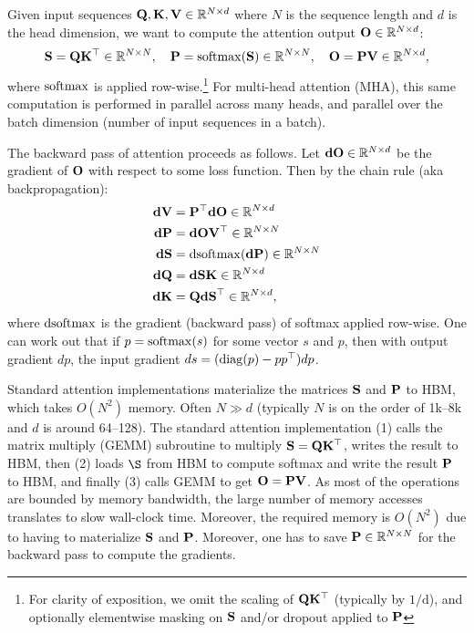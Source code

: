 Given input sequences $\mathbf{Q}, \mathbf{K}, \mathbf{V} \in \mathbb{R}^{N \times d}$ where $N$ is the sequence length and
$d$ is the head dimension, we want to compute the attention output $\mathbf{O} \in \mathbb{R}^{N \times d}$:
\begin{equation*}
  \mathbf{S} = \mathbf{Q} \mathbf{K}^\top \in \mathbb{R}^{N \times N}, \quad \mathbf{P} = \mathrm{softmax}(\mathbf{S}) \in \mathbb{R}^{N \times N}, \quad \mathbf{O} = \mathbf{P}\mathbf{V} \in \mathbb{R}^{N \times d},
\end{equation*}
where $\mathrm{softmax}$ is applied row-wise.\footnote{For clarity of exposition, we
  omit the scaling of $\mathbf{Q} \mathbf{K}^\top$ (typically by $1/\mathrm{d}$), and optionally
  elementwise masking on $\mathbf{S}$ and/or dropout applied to $\mathbf{P}$} For multi-head
attention (MHA), this same computation is performed in parallel across many
heads, and parallel over the batch dimension (number of input sequences in a
batch).

The backward pass of attention proceeds as follows.
Let $\mathbf{dO} \in \mathbb{R}^{N \times d}$ be the gradient of $\mathbf{O}$ with respect to some loss
function. Then by the chain rule (aka backpropagation):
\begin{align*}
  \mathbf{dV} &= \mathbf{P}^\top \mathbf{dO} \in \mathbb{R}^{N \times d} \\
  \mathbf{dP} &= \mathbf{dO} \mathbf{V}^\top \in \mathbb{R}^{N \times N} \\
  \mathbf{dS} &= \mathrm{dsoftmax} (\mathbf{dP}) \in \mathbb{R}^{N \times N} \\
  \mathbf{dQ} &= \mathbf{dS} \mathbf{K} \in \mathbb{R}^{N \times d} \\
  \mathbf{dK} &= \mathbf{Q} \mathbf{dS}^\top \in \mathbb{R}^{N \times d},
\end{align*}
where $\mathrm{dsoftmax}$ is the gradient (backward pass) of softmax applied row-wise.
One can work out that if $p = \mathrm{softmax}(s)$ for some vector $s$ and $p$, then
with output gradient $dp$, the input gradient $ds = (\mathrm{diag}(p) - p p^\top)dp$.

Standard attention implementations materialize the matrices $\mathbf{S}$ and $\mathbf{P}$ to
HBM, which takes $O(N^2)$ memory.
Often $N \gg d$ (typically $N$ is on the order of 1k--8k and $d$ is around 64--128).
The standard attention implementation (1) calls the matrix multiply (GEMM)
subroutine to multiply $\mathbf{S} = \mathbf{Q} \mathbf{K}^\top$, writes the result to HBM, then (2)
loads $\S$ from HBM to compute softmax and write the result $\mathbf{P}$ to HBM, and
finally (3) calls GEMM to get $\mathbf{O} = \mathbf{P} \mathbf{V}$.
As most of the operations are bounded by memory bandwidth, the large number of
memory accesses translates to slow wall-clock time.
Moreover, the required memory is $O(N^2)$ due to having to materialize $\mathbf{S}$ and
$\mathbf{P}$.
Moreover, one has to save $\mathbf{P} \in \mathbb{R}^{N \times N}$ for the backward pass to compute the
gradients.

